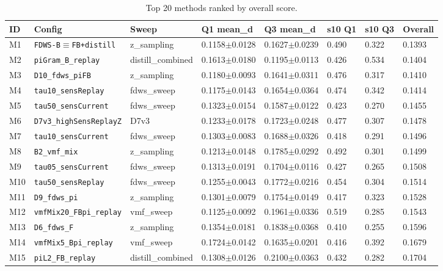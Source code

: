 \documentclass[11pt,a4paper]{article}
\begin{document}
\begin{table}[htbp]
\centering
\caption{Top 20 methods ranked by overall score.}
\label{tab:top20}
\scriptsize
\begin{tabular}{llllllll}
\toprule
ID & Config & Sweep & Q1 mean\_d & Q3 mean\_d & s10 Q1 & s10 Q3 & Overall \\
\midrule
  M1 & \texttt{FDWS-B$\equiv$FB+distill} & z\_sampling & 0.1158$\pm$0.0128 & 0.1627$\pm$0.0239 & 0.490 & 0.322 & 0.1393 \\
  M2 & \texttt{piGram\_B\_replay} & distill\_combined & 0.1613$\pm$0.0180 & 0.1195$\pm$0.0113 & 0.426 & 0.534 & 0.1404 \\
  M3 & \texttt{D10\_fdws\_piFB} & z\_sampling & 0.1180$\pm$0.0093 & 0.1641$\pm$0.0311 & 0.476 & 0.317 & 0.1410 \\
  M4 & \texttt{tau10\_sensReplay} & fdws\_sweep & 0.1175$\pm$0.0143 & 0.1654$\pm$0.0364 & 0.474 & 0.342 & 0.1414 \\
  M5 & \texttt{tau50\_sensCurrent} & fdws\_sweep & 0.1323$\pm$0.0154 & 0.1587$\pm$0.0122 & 0.423 & 0.270 & 0.1455 \\
  M6 & \texttt{D7v3\_highSensReplayZ} & D7v3 & 0.1233$\pm$0.0178 & 0.1723$\pm$0.0248 & 0.477 & 0.307 & 0.1478 \\
  M7 & \texttt{tau10\_sensCurrent} & fdws\_sweep & 0.1303$\pm$0.0083 & 0.1688$\pm$0.0326 & 0.418 & 0.291 & 0.1496 \\
  M8 & \texttt{B2\_vmf\_mix} & z\_sampling & 0.1213$\pm$0.0148 & 0.1785$\pm$0.0292 & 0.492 & 0.301 & 0.1499 \\
  M9 & \texttt{tau05\_sensCurrent} & fdws\_sweep & 0.1313$\pm$0.0191 & 0.1704$\pm$0.0116 & 0.427 & 0.265 & 0.1508 \\
  M10 & \texttt{tau50\_sensReplay} & fdws\_sweep & 0.1255$\pm$0.0043 & 0.1772$\pm$0.0216 & 0.454 & 0.304 & 0.1514 \\
  M11 & \texttt{D9\_fdws\_pi} & z\_sampling & 0.1301$\pm$0.0079 & 0.1754$\pm$0.0149 & 0.417 & 0.323 & 0.1528 \\
  M12 & \texttt{vmfMix20\_FBpi\_replay} & vmf\_sweep & 0.1125$\pm$0.0092 & 0.1961$\pm$0.0336 & 0.519 & 0.285 & 0.1543 \\
  M13 & \texttt{D6\_fdws\_F} & z\_sampling & 0.1354$\pm$0.0181 & 0.1838$\pm$0.0368 & 0.410 & 0.255 & 0.1596 \\
  M14 & \texttt{vmfMix5\_Bpi\_replay} & vmf\_sweep & 0.1724$\pm$0.0142 & 0.1635$\pm$0.0201 & 0.416 & 0.392 & 0.1679 \\
  M15 & \texttt{piL2\_FB\_replay} & distill\_combined & 0.1308$\pm$0.0126 & 0.2100$\pm$0.0363 & 0.432 & 0.282 & 0.1704 \\

\end{tabular}
\end{table}
\end{document}
